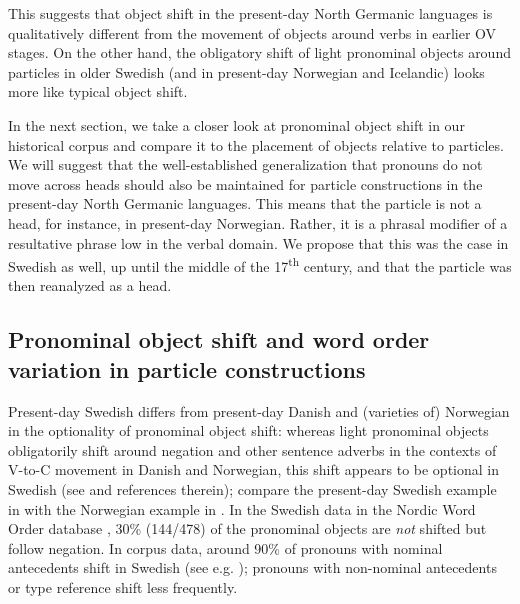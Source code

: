 \documentclass[output=paper]{langscibook}
\begin{document}
This suggests that object shift in the present-day North Germanic languages is qualitatively different from the movement of objects around verbs in earlier OV stages. On the other hand, the obligatory shift of light pronominal objects around particles in older Swedish (and in present-day Norwegian and Icelandic) looks more like typical object shift. 



In the next section, we take a closer look at pronominal object shift in our historical corpus and compare it to the placement of objects relative to particles. We will suggest that the well-established generalization that pronouns do not move across heads should also be maintained for particle constructions in the present-day North Germanic languages. This means that the particle is not a head, for instance, in present-day Norwegian. Rather, it is a phrasal modifier of a resultative phrase low in the verbal domain. We propose that this was the case in Swedish as well, up until the middle of the 17\textsuperscript{th} century, and that the particle was then reanalyzed as a head. 


\subsection{Pronominal object shift and word order variation in particle constructions}\label{sec:lalu:6.2}

Present-day Swedish differs from present-day Danish and (varieties of) Norwegian in the optionality of pronominal object shift: whereas light pronominal objects obligatorily shift around negation and other sentence adverbs in the contexts of V-to-C movement in Danish and Norwegian, this shift appears to be optional in Swedish (see \citealt{Bentzen2014} and references therein); compare the present-day Swedish example in  with the Norwegian example in . In the Swedish data in the Nordic Word Order database \citep{LundquistEtAl2019}, 30\% (144/478) of the pronominal objects are \textit{not} shifted but follow negation. In corpus data, around 90\% of pronouns with nominal antecedents shift in Swedish (see e.g. \citealt{Andreasson2008}); pronouns with non-nominal antecedents or type reference shift less frequently.


\ea\label{ex:lalu:51}
\end{document}
